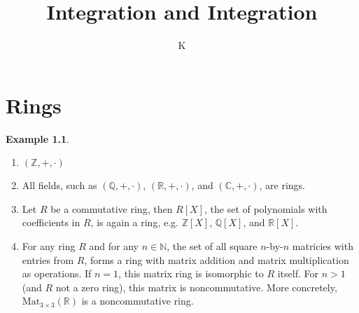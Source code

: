 \documentclass[a4paper]{book}
\title{Integration and Integration}
\author{K}
\theoremstyle{definition}
\newtheorem{example}{Example}[definition]
\begin{document}

\chapter{Rings}

\begin{example}
    \begin{enumerate}
        \item \((\mathbb{Z}, +, \cdot)\)
        \item All fields, such as \((\mathbb{Q}, +, \cdot)\), \((\mathbb{R}, +, \cdot)\), and \((\mathbb{C}, +, \cdot)\), are rings.
        \item Let \(R\) be a commutative ring, then \(R[X]\), the set of polynomials with coefficients in \(R\), is again a ring, e.g. \(\mathbb{Z}[X]\), \(\mathbb{Q}[X]\), and \(\mathbb{R}[X]\).
        \item For any ring \(R\) and for any \(n \in \mathbb{N}\), the set of all square \(n\)-by-\(n\) matricies with entries from \(R\), forms a ring with matrix addition and matrix multiplication as operations. If \(n = 1\), this matrix ring is isomorphic to \(R\) itself. For \(n > 1\) (and \(R\) not a zero ring), this matrix is noncommutative. More concretely, \(\text{Mat}_{3 \times 3}(\mathbb{R})\) is a noncommutative ring. 
    \end{enumerate}
\end{example}
\end{document}
